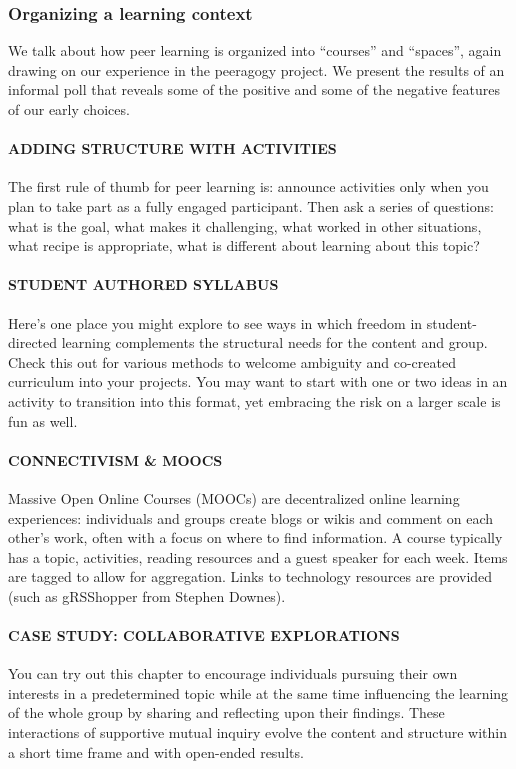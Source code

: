 \subsubsection{Organizing a learning context}

We talk about how peer learning is organized into ``courses'' and
``spaces'', again drawing on our experience in the peeragogy project. We
present the results of an informal poll that reveals some of the
positive and some of the negative features of our early choices.

\paragraph{ADDING STRUCTURE WITH ACTIVITIES} The first rule of thumb for
peer learning is: announce activities only when you plan to take part as
a fully engaged participant. Then ask a series of questions: what is the
goal, what makes it challenging, what worked in other situations, what
recipe is appropriate, what is different about learning about this
topic?

 \paragraph{STUDENT AUTHORED SYLLABUS} Here's one place you might
explore to see ways in which freedom in student-directed learning
complements the structural needs for the content and group. Check this
out for various methods to welcome ambiguity and co-created curriculum
into your projects. You may want to start with one or two ideas in an
activity to transition into this format, yet embracing the risk on a
larger scale is fun as well.

 \paragraph{CONNECTIVISM \& MOOCS} Massive Open
Online Courses (MOOCs) are decentralized online learning experiences:
individuals and groups create blogs or wikis and comment on each other's
work, often with a focus on where to find information. A course
typically has a topic, activities, reading resources and a guest speaker
for each week. Items are tagged to allow for aggregation. Links to
technology resources are provided (such as gRSShopper from Stephen
Downes).

 \paragraph{CASE STUDY: COLLABORATIVE EXPLORATIONS} You can try out this
chapter to encourage individuals pursuing their own interests in a
predetermined topic while at the same time influencing the learning of
the whole group by sharing and reflecting upon their findings. These
interactions of supportive mutual inquiry evolve the content and
structure within a short time frame and with open-ended results.

